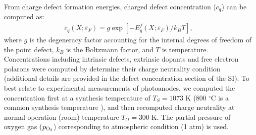 From charge defect formation energies, charged defect concentration ($c_q$) can be computed as:
\begin{align}
    c_q(X; \varepsilon_F) = g \exp [- E^f_q(X; \varepsilon_F) / k_B T],
\end{align}
where $g$ is the degeneracy factor accounting for the internal degrees of freedom of the point defect, $k_B$ is the Boltzmann factor, and $T$ is temperature.
Concentrations including intrinsic defects, extrinsic dopants and free electron polarons were computed by determine their charge neutrality condition~\cite{lee2013thermodynamics,freysoldt2014first}
(additional details are provided in the defect concentration section of the SI).
To best relate to experimental measurements of  photoanodes, we computed the concentration first at a synthesis temperature of $T_S=1073$ K (800 $^\circ$C is a common synthesis temperature \cite{ling2011sn,tian2020electronic}), and then recomputed charge neutrality at normal operation (room) temperature $T_O=300$ K.
The partial pressure of oxygen gas ($p_{\rm O_2}$) corresponding to atmospheric condition (1 atm) is used.




